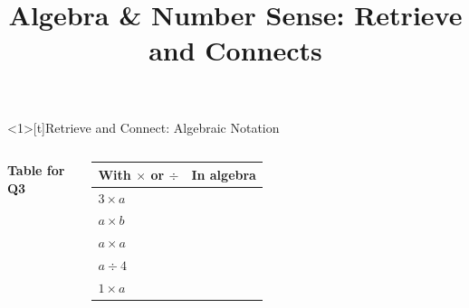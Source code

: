 \documentclass{beamer}
\title{Algebra \& Number Sense: Retrieve and Connects}
\author{}
\date{}
\newcommand{\ablank}[1]{%
  \alt<2>{\textcolor{red}{#1}}{\underline{\phantom{#1}}}%
}
\newcommand{\dheading}[1]{{\scriptsize\bfseries #1}\par\vspace{0.2em}}
\newcommand{\tblank}[1]{\ablank{\makebox[1.6em]{#1}}}
\newcommand{\tgiven}[1]{\makebox[1.6em]{#1}}
\begin{document}

\begin{frame}<1>[t]{Retrieve and Connect: Algebraic Notation}
\begin{columns}[T,onlytextwidth]

\vspace{-0.4em}
\dheading{Table for Q3}
{\footnotesize
\renewcommand{\arraystretch}{1.25}
\begin{tabular}{@{}l|l@{}}
  With $\times$ or $\div$ & In algebra\\ \hline
  $3\times a$ & \tgiven{$3a$}\\
  $a\times b$ & \tblank{$ab$}\\
  $a\times a$ & \tblank{$a^2$}\\
  $a\div4$    & \tblank{$\dfrac{a}{4}$}\\[2pt]
  $1\times a$ & \tblank{$a$}
\end{tabular}}


\end{columns}
\end{frame}
\end{document}
